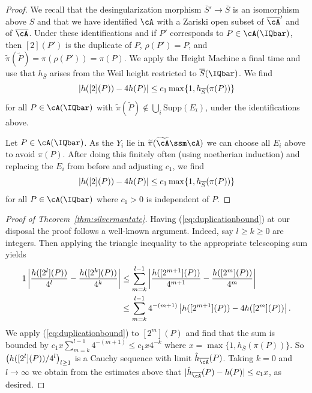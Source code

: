 \begin{proof}
We recall that the desingularization morphism $\overline S'\rightarrow\overline S$ is an
isomorphism above $S$ and that we have identified $\cA$ with a Zariski
open subset of $\overline{\cA}'$ and of $\overline{\cA}$.
Under these identifications and if $P'$ corresponds to $P\in
\cA(\IQbar)$, then $[2](P')$ is the duplicate of $P$,
$\rho(P')= P$, and $\widetilde\pi(\widetilde P) = \pi(\rho(P'))=\pi(P)$.  We apply the Height
 Machine a final time and use that $h_{\overline S}$ arises from the
 Weil height restricted to $\overline{S}(\IQbar)$. We
 find
 \begin{equation*}
\left|   h([2](P)) - 4
   h(P)\right|   \le c_1
 \max\{1,h_{\overline S}(\pi(P))\}
 \end{equation*}
 for all $P\in \cA(\IQbar)$   with  $\widetilde\pi(\widetilde
 P)\not\in \bigcup_i \mathrm{Supp}(E_i)$, under the identifications
 above.

Let $P\in\cA(\IQbar)$. As the $Y_i$ lie in $\widetilde\pi(\widetilde\cA\ssm
\cA)$ we can choose all $E_i$ above to avoid $\pi(P)$.  After doing this finitely often (using
noetherian induction) and replacing the $E_i$ from before and
adjusting $c_1$, we find
\begin{equation*}
\left|   h([2](P)) - 4
   h(P)\right|  \le c_1 \max\{1,h_{\overline S}(\pi(P))\}
\end{equation*}
for all $P\in \cA(\IQbar)$ where $c_1>0$ is independent of $P$.
\end{proof}

\begin{proof}[Proof of Theorem~\ref{thm:silvermantate}]
  Having (\ref{eq:duplicationbound}) at our disposal the proof follows
  a well-known argument.
  Indeed, say $l\ge k\ge 0$ are integers.
  Then applying the triangle inequality to the appropriate telescoping
  sum yields
  \begin{alignat*}1
    \left|\frac{\hcA([2^l](P))}{4^l}- \frac{\hcA([2^k](P))}{4^k}\right|
    &\le \sum_{m=k}^{l-1}
        \left|\frac{\hcA([2^{m+1}](P))}{4^{m+1}}-
        \frac{\hcA([2^m](P))}{4^m}\right|\\
        &\le \sum_{m=k}^{l-1}
        4^{-(m+1)}    \left|{\hcA([2^{m+1}](P))}- 4{\hcA([2^m](P))}\right|.
  \end{alignat*}
  We apply (\ref{eq:duplicationbound}) to $[2^m](P)$ and find that the
  sum is bounded by $c_1 x \sum_{m=k}^{l-1}4^{-(m+1)} \le c_1 x 4^{-k}$
  where $x = \max\{1,h_{\overline S}(\pi(P))\}$.
  So $\left(h([2^l](P))/4^l\right)_{l\ge 1}$ is a Cauchy sequence
  with limit
  $\hat h_{\overline\cA}(P)$.
  Taking $k=0$ and $l\rightarrow \infty$ we obtain from the estimates
  above that
  $|\hat h_{\overline\cA}(P) - \hcA(P)|\le c_1x$, as
  desired.
\end{proof}
% 

% 





